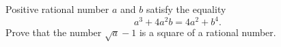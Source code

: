 Positive rational number $a$ and $b$ satisfy the equality
\[a^3 + 4a^2b = 4a^2 + b^4.\]
Prove that the number $\sqrt{a}-1$ is a square of a rational number.